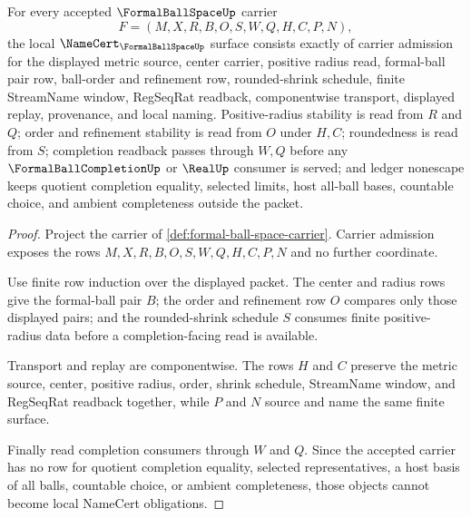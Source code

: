\begin{theorem}
\label{thm:formal-ball-space-namecert-obligations}
For every accepted $\FormalBallSpaceUp$ carrier
$$
F=(M,X,R,B,O,S,W,Q,H,C,P,N),
$$
the local $\NameCert_{\FormalBallSpaceUp}$ surface consists exactly of carrier admission for the displayed metric source, center carrier, positive radius read, formal-ball pair row, ball-order and refinement row, rounded-shrink schedule, finite StreamName window, RegSeqRat readback, componentwise transport, displayed replay, provenance, and local naming. Positive-radius stability is read from $R$ and $Q$; order and refinement stability is read from $O$ under $H,C$; roundedness is read from $S$; completion readback passes through $W,Q$ before any $\FormalBallCompletionUp$ or $\RealUp$ consumer is served; and ledger nonescape keeps quotient completion equality, selected limits, host all-ball bases, countable choice, and ambient completeness outside the packet.
\end{theorem}
\begin{proof}
Project the carrier of \autoref{def:formal-ball-space-carrier}. Carrier admission exposes the rows $M,X,R,B,O,S,W,Q,H,C,P,N$ and no further coordinate.

Use finite row induction over the displayed packet. The center and radius rows give the formal-ball pair $B$; the order and refinement row $O$ compares only those displayed pairs; and the rounded-shrink schedule $S$ consumes finite positive-radius data before a completion-facing read is available.

Transport and replay are componentwise. The rows $H$ and $C$ preserve the metric source, center, positive radius, order, shrink schedule, StreamName window, and RegSeqRat readback together, while $P$ and $N$ source and name the same finite surface.

Finally read completion consumers through $W$ and $Q$. Since the accepted carrier has no row for quotient completion equality, selected representatives, a host basis of all balls, countable choice, or ambient completeness, those objects cannot become local NameCert obligations.
\end{proof}


